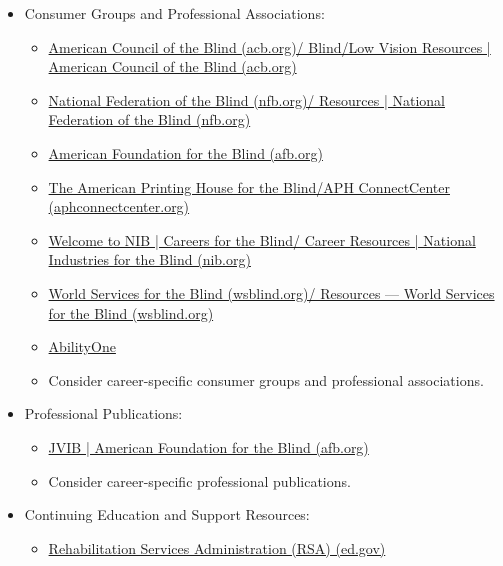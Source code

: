 \begin{itemize}[leftmargin=*]
\item Consumer Groups and Professional Associations:
\begin{itemize}
\item \href{https://www.acb.org/blind-low-vision-resources}{American Council of the Blind (acb.org)/ Blind/Low Vision Resources | American Council of the Blind (acb.org)}
\item \href{https://nfb.org/resources}{National Federation of the Blind (nfb.org)/ Resources | National Federation of the Blind (nfb.org)}
\item \href{https://www.afb.org/}{American Foundation for the Blind (afb.org)}
\item \href{https://aphconnectcenter.org/}{The American Printing House for the Blind/APH ConnectCenter (aphconnectcenter.org)}
\item \href{https://www.nib.org/resources/#skip_link_main_content}{Welcome to NIB | Careers for the Blind/ Career Resources | National Industries for the Blind (nib.org)}
\item \href{https://www.wsblind.org/resources}{World Services for the Blind (wsblind.org)/ Resources — World Services for the Blind (wsblind.org)}
\item \href{https://www.abilityone.gov/}{AbilityOne}
\item Consider career-specific consumer groups and professional associations.
\end{itemize}
\item Professional Publications:
\begin{itemize}
\item \href{https://www.afb.org/news-publications/publications/jvib}{JVIB | American Foundation for the Blind (afb.org)}
\item Consider career-specific professional publications.
\end{itemize}
\item Continuing Education and Support Resources:
\begin{itemize}
\item \href{https://nam11.safelinks.protection.outlook.com/?url=https%3A%2F%2Frsa.ed.gov%2Fabout%2Fstates&data=05%7C01%7Cchris_fendrick%40kernhigh.org%7Cbc7ebcd1034f4b8956c808da4e0886ed%7C79e9a47a04484925bf6638dadfc6f0a4%7C0%7C0%7C637908095803823825%7CUnknown%7CTWFpbGZsb3d8eyJWIjoiMC4wLjAwMDAiLCJQIjoiV2luMzIiLCJBTiI6Ik1haWwiLCJXVCI6Mn0%3D%7C3000%7C%7C%7C&sdata=7Yp0WqYpmUt23krj04UuAfM%2FfPtXDqngbOewfl9go10%3D&reserved=0}{Rehabilitation Services Administration (RSA) (ed.gov)}

\end{itemize}
\end{itemize}
